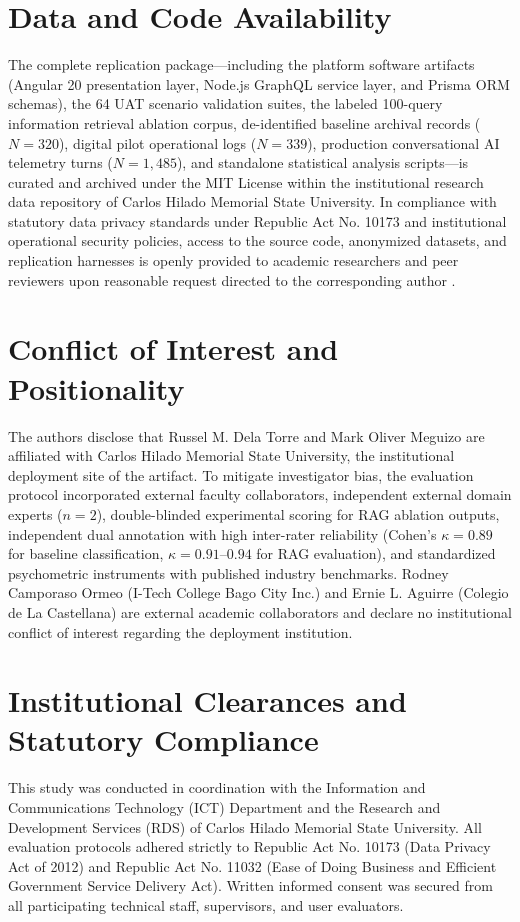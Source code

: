 \documentclass[conference]{IEEEtran}
\begin{document}
\section*{Data and Code Availability}
The complete replication package---including the platform software artifacts (Angular 20 presentation layer, Node.js GraphQL service layer, and Prisma ORM schemas), the 64 UAT scenario validation suites, the labeled 100-query information retrieval ablation corpus, de-identified baseline archival records ($N = 320$), digital pilot operational logs ($N = 339$), production conversational AI telemetry turns ($N = 1,485$), and standalone statistical analysis scripts---is curated and archived under the MIT License within the institutional research data repository of Carlos Hilado Memorial State University. In compliance with statutory data privacy standards under Republic Act No. 10173 \cite{ref28} and institutional operational security policies, access to the source code, anonymized datasets, and replication harnesses is openly provided to academic researchers and peer reviewers upon reasonable request directed to the corresponding author .

\section*{Conflict of Interest and Positionality}
The authors disclose that Russel M. Dela Torre and Mark Oliver Meguizo are affiliated with Carlos Hilado Memorial State University, the institutional deployment site of the artifact. To mitigate investigator bias, the evaluation protocol incorporated external faculty collaborators, independent external domain experts ($n = 2$), double-blinded experimental scoring for RAG ablation outputs, independent dual annotation with high inter-rater reliability (Cohen's $\kappa = 0.89$ for baseline classification, $\kappa = 0.91$--$0.94$ for RAG evaluation), and standardized psychometric instruments with published industry benchmarks. Rodney Camporaso Ormeo (I-Tech College Bago City Inc.) and Ernie L. Aguirre (Colegio de La Castellana) are external academic collaborators and declare no institutional conflict of interest regarding the deployment institution.

\section*{Institutional Clearances and Statutory Compliance}
This study was conducted in coordination with the Information and Communications Technology (ICT) Department and the Research and Development Services (RDS) of Carlos Hilado Memorial State University. All evaluation protocols adhered strictly to Republic Act No. 10173 (Data Privacy Act of 2012) \cite{ref28} and Republic Act No. 11032 (Ease of Doing Business and Efficient Government Service Delivery Act). Written informed consent was secured from all participating technical staff, supervisors, and user evaluators.
\end{document}
